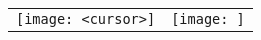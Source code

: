 \begin{figure}[]
	\begin{tabular}{cc}
		\begin{minipage}{.5\textwidth}
			\texttt{[image: <cursor>]}
			\label{}
		\end{minipage} &
		
		\begin{minipage}{.5\textwidth}
			\texttt{[image: ]}
			\label{}
		\end{minipage}
	\end{tabular}
	
	\caption{}
\end{figure}
